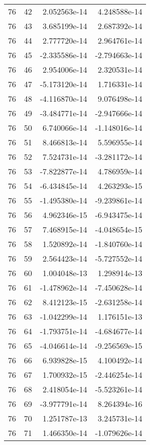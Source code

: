 \begin{tabular}{rrrr}
  76 &   42 &  2.052563e-14 &  4.248588e-14 \\
  76 &   43 &  3.685199e-14 &  2.687392e-14 \\
  76 &   44 &  2.777720e-14 &  2.964761e-14 \\
  76 &   45 & -2.335586e-14 & -2.794663e-14 \\
  76 &   46 &  2.954006e-14 &  2.320531e-14 \\
  76 &   47 & -5.173120e-14 &  1.716331e-14 \\
  76 &   48 & -4.116870e-14 &  9.076498e-14 \\
  76 &   49 & -3.484771e-14 & -2.947666e-14 \\
  76 &   50 &  6.740066e-14 & -1.148016e-14 \\
  76 &   51 &  8.466813e-14 &  5.596955e-14 \\
  76 &   52 &  7.524731e-14 & -3.281172e-14 \\
  76 &   53 & -7.822877e-14 &  4.786959e-14 \\
  76 &   54 & -6.434845e-14 &  4.263293e-15 \\
  76 &   55 & -1.495380e-14 & -9.239861e-14 \\
  76 &   56 &  4.962346e-15 & -6.943475e-14 \\
  76 &   57 &  7.468915e-14 & -4.048654e-15 \\
  76 &   58 &  1.520892e-14 & -1.840760e-14 \\
  76 &   59 &  2.564423e-14 & -5.727552e-14 \\
  76 &   60 &  1.004048e-13 &  1.298914e-13 \\
  76 &   61 & -1.478962e-14 & -7.450628e-14 \\
  76 &   62 &  8.412123e-15 & -2.631258e-14 \\
  76 &   63 & -1.042299e-14 &  1.176151e-13 \\
  76 &   64 & -1.793751e-14 & -4.684677e-14 \\
  76 &   65 & -4.046614e-14 & -9.256569e-15 \\
  76 &   66 &  6.939828e-15 &  4.100492e-14 \\
  76 &   67 &  1.700932e-15 & -2.446254e-14 \\
  76 &   68 &  2.418054e-14 & -5.523261e-14 \\
  76 &   69 & -3.977791e-14 &  8.264394e-16 \\
  76 &   70 &  1.251787e-13 &  3.245731e-14 \\
  76 &   71 &  1.466350e-14 & -1.079626e-14 \\

\end{tabular}
